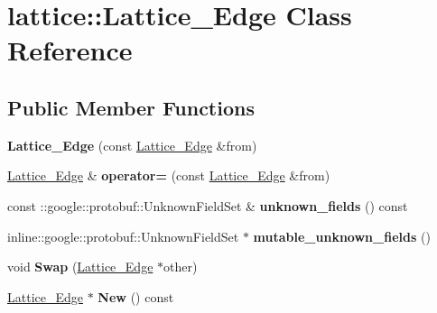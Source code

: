 \hypertarget{classlattice_1_1Lattice__Edge}{
\section{lattice::Lattice\_\-Edge Class Reference}
\label{classlattice_1_1Lattice__Edge}
}
\subsection*{Public Member Functions}
\begin{DoxyCompactItemize}
\item 
\hypertarget{classlattice_1_1Lattice__Edge_acd52c069d2b4ccd5e35415ced12a8de3}{
{\bfseries Lattice\_\-Edge} (const \hyperlink{classlattice_1_1Lattice__Edge}{Lattice\_\-Edge} \&from)}
\label{classlattice_1_1Lattice__Edge_acd52c069d2b4ccd5e35415ced12a8de3}

\item 
\hypertarget{classlattice_1_1Lattice__Edge_a7b8481bf7bbecf282e2f938ff35da177}{
\hyperlink{classlattice_1_1Lattice__Edge}{Lattice\_\-Edge} \& {\bfseries operator=} (const \hyperlink{classlattice_1_1Lattice__Edge}{Lattice\_\-Edge} \&from)}
\label{classlattice_1_1Lattice__Edge_a7b8481bf7bbecf282e2f938ff35da177}

\item 
\hypertarget{classlattice_1_1Lattice__Edge_af44f15fd53ae86dd482f86e74bf4ce55}{
const ::google::protobuf::UnknownFieldSet \& {\bfseries unknown\_\-fields} () const }
\label{classlattice_1_1Lattice__Edge_af44f15fd53ae86dd482f86e74bf4ce55}

\item 
\hypertarget{classlattice_1_1Lattice__Edge_aae27de06c0aa0d1cdae07ba720e7eb7c}{
inline::google::protobuf::UnknownFieldSet $\ast$ {\bfseries mutable\_\-unknown\_\-fields} ()}
\label{classlattice_1_1Lattice__Edge_aae27de06c0aa0d1cdae07ba720e7eb7c}

\item 
\hypertarget{classlattice_1_1Lattice__Edge_aaaa95dd26cb8b36f35652fba54be5679}{
void {\bfseries Swap} (\hyperlink{classlattice_1_1Lattice__Edge}{Lattice\_\-Edge} $\ast$other)}
\label{classlattice_1_1Lattice__Edge_aaaa95dd26cb8b36f35652fba54be5679}

\item 
\hypertarget{classlattice_1_1Lattice__Edge_acc76640ed8442651c644733e539cf1eb}{
\hyperlink{classlattice_1_1Lattice__Edge}{Lattice\_\-Edge} $\ast$ {\bfseries New} () const }
\label{classlattice_1_1Lattice__Edge_acc76640ed8442651c644733e539cf1eb}


\end{DoxyCompactItemize}
